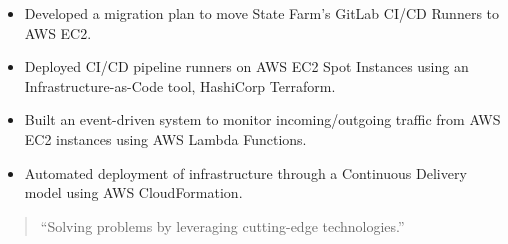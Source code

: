 \documentclass[10pt,a4paper,ragged2e,withhyper]{altacv}
\begin{document}
\begin{paracol}{2}
\divider


\begin{itemize}
\item Developed a migration plan to move State Farm's GitLab CI/CD Runners to AWS EC2.
\item Deployed CI/CD pipeline runners on AWS EC2 Spot Instances using an Infrastructure-as-Code tool, HashiCorp Terraform.
\end{itemize}

\divider


\begin{itemize}
\item Built an event-driven system to monitor incoming/outgoing traffic from AWS EC2 instances using AWS Lambda Functions.
\item Automated deployment of infrastructure through a Continuous Delivery model using AWS CloudFormation.
\end{itemize}

\switchcolumn

\begin{quote}
``Solving problems by leveraging cutting-edge technologies.''
\end{quote}


\medskip




\end{paracol}
\end{document}
